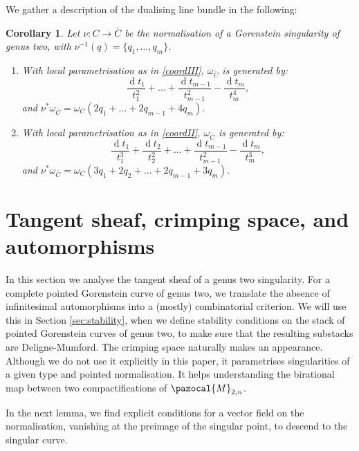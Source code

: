 \documentclass{compositio}
\renewcommand{\to}{\rightarrow}
\theoremstyle{plain}
\newtheorem{cor}[thm]{Corollary}
\theoremstyle{definition}
\theoremstyle{remark}
\begin{document}
We gather a description of the dualising line bundle in the following:
\begin{cor}\label{cor:dualising_line_bundle}
 Let $\nu\colon C\to \bar C$ be the normalisation of a Gorenstein singularity of genus two, with $\nu^{-1}(q)=\{q_1,\ldots,q_m\}$.
 \begin{enumerate}[label=(\Roman*)]
 
 \item With local parametrisation as in \eqref{coordIII}, $\omega_{\bar C}$ is generated by: \[\frac{\operatorname{d}t_1}{t_1^2}+\ldots+\frac{\operatorname{d}t_{m-1}}{t_{m-1}^2}-\frac{\operatorname{d}t_m}{t_m^4},\]
 and $\nu^*\omega_{\bar C}=\omega_C(2q_1+\ldots+2q_{m-1}+4q_m)$.

 \item With local parametrisation as in \eqref{coordII}, $\omega_{\bar C}$ is generated by:
  \[\frac{\operatorname{d}t_1}{t_1^3}+\frac{\operatorname{d}t_2}{t_2^2}+\ldots+\frac{\operatorname{d}t_{m-1}}{t_{m-1}^2}-\frac{\operatorname{d}t_m}{t_m^3},\]  
  and $\nu^*\omega_{\bar C}=\omega_C(3q_1+2q_2+\ldots+2q_{m-1}+3q_m)$.
                                                                                                                                  \end{enumerate}
\end{cor}


\section{Tangent sheaf, crimping space, and automorphisms}\label{sec:crimp}
In this section we analyse the tangent sheaf of a genus two singularity. For a complete pointed Gorenstein curve of genus two, we translate the absence of infinitesimal automorphisms into a (mostly) combinatorial criterion. We will use this in Section \ref{sec:stability}, when we define stability conditions on the stack of pointed Gorenstein curves of genus two, to make sure that the resulting substacks are Deligne-Mumford. The crimping space naturally makes an appearance. Although we do not use it explicitly in this paper, it parametrises singularities of a given type and pointed normalisation. It helps understanding the birational map between two compactifications of $\pazocal{M}_{2,n}$.

In the next lemma, we find explicit conditions for a vector field on the normalisation, vanishing at the preimage of the singular point, to descend to the singular curve.
\end{document}
